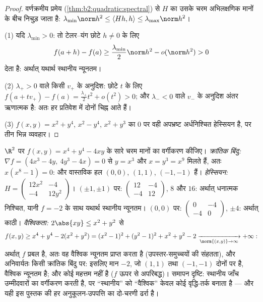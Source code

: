 \begin{proof}
वर्णक्रमीय प्रमेय (\cref{thm:b2:quadratic:spectral}) से $H$ का  उसके चरम अभिलक्षणिक मानों
के बीच निचुड़ जाता है: $\lambda_{\min}\norm h^2 \leq \langle Hh, h\rangle \leq
\lambda_{\max}\norm h^2$।

(1) यदि $\lambda_{\min} > 0$: तो टेलर--यंग छोटे $h \neq 0$ के लिए
\[
f(a + h) - f(a) \geq \frac{\lambda_{\min}}{2}\norm h^2 -
o(\norm h^2) > 0
\]
देता है: अर्थात् यथार्थ स्थानीय न्यूनतम।

(2) $\lambda_+ > 0$ वाले किसी  $v_+$ के अनुदिश: छोटे $t$ के लिए $f(a + tv_+) -
f(a) = \frac{\lambda_+}{2}t^2 + o(t^2) > 0$; और
$\lambda_- < 0$ वाले $v_-$ के अनुदिश अंतर ऋणात्मक है: अतः हर प्रतिवेश में दोनों चिह्न
आते हैं।

(3) $f(x,y) = x^2 + y^4$, $x^2 - y^4$, $x^2 + y^3$ का $0$ पर वही अपभ्रष्ट अर्धनिश्चित हेस्सियन है, पर तीन
भिन्न व्यवहार।
\end{proof}

\begin{example}[एक पूरा वर्गीकरण, वैश्विक सहित]\label{ex:b2:diffcalc:quarticrun}
$\R^2$ पर $f(x, y) = x^4 + y^4 - 4xy$ के सारे चरम मानों का वर्गीकरण कीजिए। \emph{क्रांतिक बिंदु:}
$\nabla f = (4x^3 - 4y,\ 4y^3 - 4x) =
0$ से $y = x^3$ और $x = y^3 = x^9$ मिलते हैं, अतः $x(x^8 - 1) = 0$: और वास्तविक हल $(0,0)$, $(1,1)$, $(-1,-1)$ हैं।
\emph{हेस्सियन:} $H = \begin{pmatrix} 12x^2 & -4\\ -4 &
12y^2\end{pmatrix}$। $(\pm1, \pm1)$ पर: $\begin{pmatrix} 12 &
-4\\ -4 & 12\end{pmatrix}$,  $8$ और $16$:
अर्थात् धनात्मक निश्चित, यानी $f = -2$ के साथ यथार्थ स्थानीय न्यूनतम। $(0,0)$
पर: $\begin{pmatrix} 0 & -4\\ -4 & 0\end{pmatrix}$,  $\pm4$: अर्थात् काठी। \emph{वैश्विकता:} $2\abs{xy} \leq x^2 +
y^2$ से
\[
f(x, y) \geq x^4 + y^4 - 2(x^2 + y^2)
= (x^2 - 1)^2 + (y^2 - 1)^2 + x^2 + y^2 - 2
\xrightarrow[\norm{(x,y)}\to\infty]{} +\infty :
\]
अर्थात् $f$ प्रबल है, अतः वह वैश्विक न्यूनतम प्राप्त करता है
(उपस्तर-समुच्चयों की संहतता), और अनिवार्यतः किसी क्रांतिक बिंदु पर: इसलिए
मान $-2$, जो $(1,1)$ तथा $(-1,-1)$ दोनों पर है, वैश्विक न्यूनतम है; और कोई महत्तम
नहीं है ($f$ ऊपर से अपरिबद्ध)। समापन दृष्टि: स्थानीय जाँच उम्मीदवारों का
वर्गीकरण करती है, पर ``स्थानीय'' को ``वैश्विक'' केवल कोई वृद्धि-तर्क बनाता
है --- और यही इस पुस्तक की हर अनुकूलन-उपपत्ति का दो-चरणी ढर्रा है।
\end{example}

